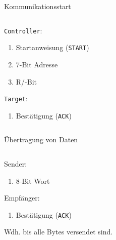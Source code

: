 \documentclass[12pt]{beamer}
\newcounter{listnum}
\begin{document}
	\begin{frame}{Kommunikationsstart}
		\begin{columns}
			\begin{column}{0.45\textwidth}
				\texttt{Controller}:
				\begin{enumerate}
					\item Startanweisung (\texttt{START})
					\item 7-Bit Adresse
					\item R/-Bit
					
					\setcounter{listnum}{\value{enumi}}
				\end{enumerate}
				\texttt{Target}:
				\begin{enumerate}
					\setcounter{enumi}{\value{listnum}}
					
					\item Bestätigung (\texttt{ACK})
				\end{enumerate}
			\end{column}
			\begin{column}{0.5\textwidth}
				\begin{figure}
					
				\end{figure}
			\end{column}
		\end{columns}
	\end{frame}

	\begin{frame}{Übertragung von Daten}
		\begin{columns}
			\begin{column}{0.45\textwidth}
				Sender:
				\begin{enumerate}
					\item 8-Bit Wort
					
					\setcounter{listnum}{\value{enumi}}
				\end{enumerate}
				
				Empfänger:
				\begin{enumerate}
					\setcounter{enumi}{\value{listnum}}
					
					\item Bestätigung (\texttt{ACK})
				\end{enumerate}
				
				\vspace{5ex}
				Wdh. bis alle Bytes versendet sind.
			\end{column}
			\begin{column}{0.5\textwidth}
				\begin{figure}
					
				\end{figure}
			\end{column}
		\end{columns}
	\end{frame}
\end{document}
